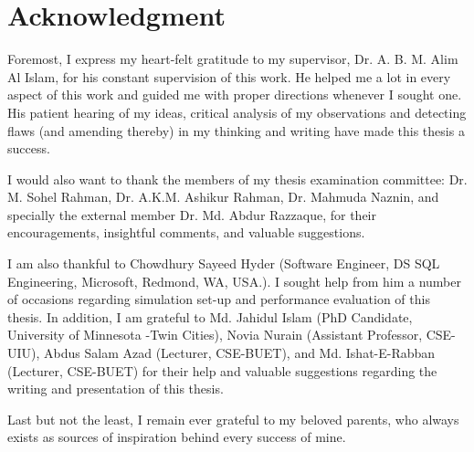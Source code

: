 \chapter*{Acknowledgment}

Foremost, I express my heart-felt gratitude to my supervisor, Dr. A. B. M. Alim Al Islam, for his constant supervision of this work. He helped me a lot in every aspect of this work and guided me with proper directions whenever I sought one. His patient hearing of my ideas, critical analysis of my observations and detecting flaws (and amending thereby) in my thinking and writing have made this thesis a success.

I would also want to thank the members of my thesis examination committee: Dr. M. Sohel Rahman, Dr. A.K.M. Ashikur Rahman, Dr. Mahmuda Naznin, and specially the external member Dr. Md. Abdur Razzaque, for their encouragements, insightful comments, and valuable suggestions.

I am also thankful to Chowdhury Sayeed Hyder (Software Engineer, DS SQL Engineering, Microsoft, Redmond, WA, USA.). I sought help from him a number of occasions regarding simulation set-up and performance evaluation of this thesis. In addition, I am grateful to Md. Jahidul Islam (PhD Candidate, University of Minnesota -Twin Cities), Novia Nurain (Assistant Professor, CSE-UIU), Abdus Salam Azad (Lecturer, CSE-BUET), and Md. Ishat-E-Rabban (Lecturer, CSE-BUET) for their help and valuable suggestions regarding the writing and presentation of this thesis.

Last but not the least, I remain ever grateful to my beloved parents, who always exists as sources of inspiration behind every success of mine.
